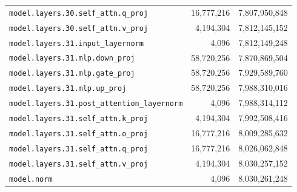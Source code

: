 \documentclass[10pt,a4paper]{article}
\theoremstyle{definition}
\begin{document}
\begin{appendices}
\begin{longtable}{p{9.5cm}rr}
\texttt{model.\allowbreak{}layers.\allowbreak{}30.\allowbreak{}self\_attn.\allowbreak{}q\_proj} & 16,777,216 & 7,807,950,848 \\
\texttt{model.\allowbreak{}layers.\allowbreak{}30.\allowbreak{}self\_attn.\allowbreak{}v\_proj} & 4,194,304 & 7,812,145,152 \\
\texttt{model.\allowbreak{}layers.\allowbreak{}31.\allowbreak{}input\_layernorm} & 4,096 & 7,812,149,248 \\
\texttt{model.\allowbreak{}layers.\allowbreak{}31.\allowbreak{}mlp.\allowbreak{}down\_proj} & 58,720,256 & 7,870,869,504 \\
\texttt{model.\allowbreak{}layers.\allowbreak{}31.\allowbreak{}mlp.\allowbreak{}gate\_proj} & 58,720,256 & 7,929,589,760 \\
\texttt{model.\allowbreak{}layers.\allowbreak{}31.\allowbreak{}mlp.\allowbreak{}up\_proj} & 58,720,256 & 7,988,310,016 \\
\texttt{model.\allowbreak{}layers.\allowbreak{}31.\allowbreak{}post\_attention\_layernorm} & 4,096 & 7,988,314,112 \\
\texttt{model.\allowbreak{}layers.\allowbreak{}31.\allowbreak{}self\_attn.\allowbreak{}k\_proj} & 4,194,304 & 7,992,508,416 \\
\texttt{model.\allowbreak{}layers.\allowbreak{}31.\allowbreak{}self\_attn.\allowbreak{}o\_proj} & 16,777,216 & 8,009,285,632 \\
\texttt{model.\allowbreak{}layers.\allowbreak{}31.\allowbreak{}self\_attn.\allowbreak{}q\_proj} & 16,777,216 & 8,026,062,848 \\
\texttt{model.\allowbreak{}layers.\allowbreak{}31.\allowbreak{}self\_attn.\allowbreak{}v\_proj} & 4,194,304 & 8,030,257,152 \\
\texttt{model.\allowbreak{}norm} & 4,096 & 8,030,261,248 \\
\end{longtable}
\end{appendices}
\end{document}
